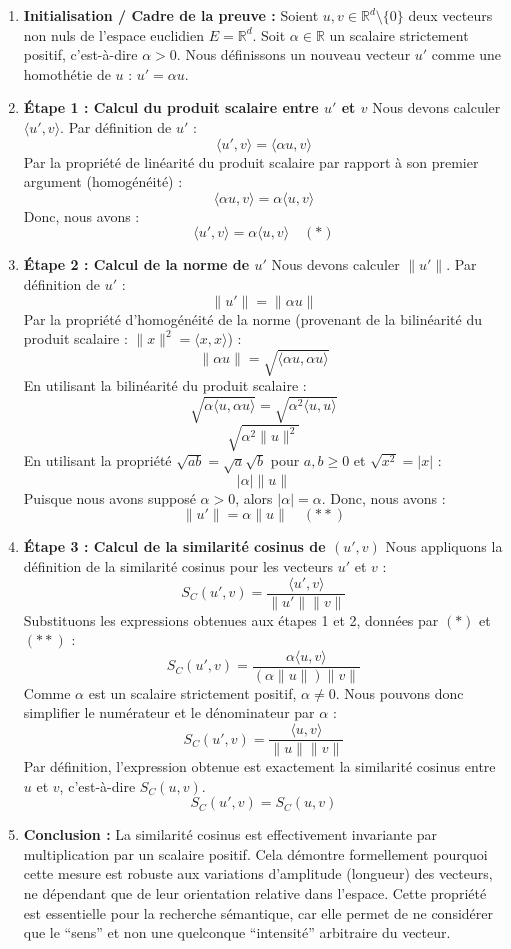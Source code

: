 \documentclass[11pt,a4paper]{report}
\begin{document}
\begin{enumerate}
\def\labelenumi{\arabic{enumi}.}
\item
  \textbf{Initialisation / Cadre de la preuve :} Soient
  \(u, v \in \mathbb{R}^d \setminus \{0\}\) deux vecteurs non nuls de
  l'espace euclidien \(E = \mathbb{R}^d\). Soit
  \(\alpha \in \mathbb{R}\) un scalaire strictement positif,
  c'est-à-dire \(\alpha > 0\). Nous définissons un nouveau vecteur
  \(u'\) comme une homothétie de \(u\) : \(u' = \alpha u\).
\item
  \textbf{Étape 1 : Calcul du produit scalaire entre \(u'\) et \(v\)}
  Nous devons calculer \(\langle u', v \rangle\). Par définition de
  \(u'\) : \[ \langle u', v \rangle = \langle \alpha u, v \rangle \] Par
  la propriété de linéarité du produit scalaire par rapport à son
  premier argument (homogénéité) :
  \[ \langle \alpha u, v \rangle = \alpha \langle u, v \rangle \] Donc,
  nous avons :
  \[ \langle u', v \rangle = \alpha \langle u, v \rangle \quad (*)\]
\item
  \textbf{Étape 2 : Calcul de la norme de \(u'\)} Nous devons calculer
  \(\|u'\|\). Par définition de \(u'\) : \[ \|u'\| = \|\alpha u\| \] Par
  la propriété d'homogénéité de la norme (provenant de la bilinéarité du
  produit scalaire : \(\|x\|^2 = \langle x, x \rangle\)) :
  \[ \|\alpha u\| = \sqrt{\langle \alpha u, \alpha u \rangle} \] En
  utilisant la bilinéarité du produit scalaire :
  \[ \sqrt{\alpha \langle u, \alpha u \rangle} = \sqrt{\alpha^2 \langle u, u \rangle} \]
  \[ \sqrt{\alpha^2 \|u\|^2} \] En utilisant la propriété
  \(\sqrt{ab} = \sqrt{a}\sqrt{b}\) pour \(a, b \ge 0\) et
  \(\sqrt{x^2} = |x|\) : \[ |\alpha| \|u\| \] Puisque nous avons supposé
  \(\alpha > 0\), alors \(|\alpha| = \alpha\). Donc, nous avons :
  \[ \|u'\| = \alpha \|u\| \quad (**) \]
\item
  \textbf{Étape 3 : Calcul de la similarité cosinus de \((u', v)\)} Nous
  appliquons la définition de la similarité cosinus pour les vecteurs
  \(u'\) et \(v\) :
  \[ S_C(u', v) = \frac{\langle u', v \rangle}{\|u'\| \|v\|} \]
  Substituons les expressions obtenues aux étapes 1 et 2, données par
  \((*)\) et \((**)\) :
  \[ S_C(u', v) = \frac{\alpha \langle u, v \rangle}{(\alpha \|u\|) \|v\|} \]
  Comme \(\alpha\) est un scalaire strictement positif,
  \(\alpha \neq 0\). Nous pouvons donc simplifier le numérateur et le
  dénominateur par \(\alpha\) :
  \[ S_C(u', v) = \frac{\langle u, v \rangle}{\|u\| \|v\|} \] Par
  définition, l'expression obtenue est exactement la similarité cosinus
  entre \(u\) et \(v\), c'est-à-dire \(S_C(u, v)\).
  \[ S_C(u', v) = S_C(u, v) \]
\item
  \textbf{Conclusion :} La similarité cosinus est effectivement
  invariante par multiplication par un scalaire positif. Cela démontre
  formellement pourquoi cette mesure est robuste aux variations
  d'amplitude (longueur) des vecteurs, ne dépendant que de leur
  orientation relative dans l'espace. Cette propriété est essentielle
  pour la recherche sémantique, car elle permet de ne considérer que le
  ``sens'' et non une quelconque ``intensité'' arbitraire du vecteur.
\end{enumerate}
\end{document}
